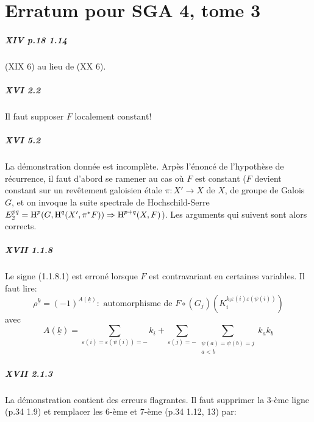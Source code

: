 
\appendix
\chapter{Erratum pour SGA 4, tome 3}

\paragraph{XIV p.18 1.14}
(XIX 6) au lieu de (XX 6). 

\paragraph{XVI 2.2}
Il faut supposer $F$ localement constant!

\paragraph{XVI 5.2}
La démonstration donnée est incomplète. Arpès l'énoncé de 
l'hypothèse de récurrence, il faut d'abord se ramener au cas o\`u $F$ est 
constant ($F$ devient constant sur un rev\^etement galoisien étale 
$\pi:X'\to X$ de $X$, de groupe de Galois $G$, et on invoque la suite spectrale 
de Hochschild-Serre $E_2^{p q}=\operatorname{H}^p(G,\operatorname{H}^q(X',\pi^\ast F))\Rightarrow \operatorname{H}^{p+q}(X,F)$). 
Les arguments qui suivent sont alors corrects. 

\paragraph{XVII 1.1.8}
Le signe (1.1.8.1) est erroné lorsque $F$ est contravariant en certaines 
variables. Il faut lire: 
\begin{equation*}\tag{1.1.8.1}
  \rho^{\underline k} = (-1)^{A(\underline k)}: \text{ automorphisme de }
F\circ (G_j)\left(K_i^{k_i\varepsilon(i)\varepsilon(\psi(i))}\right) 
\end{equation*}
avec 
\[
  A(\underline k) = \sum_{\varepsilon(i) = \varepsilon(\psi(i))=-} k_i + \sum_{\varepsilon(j)=-} \sum_{\substack{\psi(a)=\psi(b)=j \\ a<b}} k_a k_b 
\]

\paragraph{XVII 2.1.3}
La démonstration contient des erreurs flagrantes. Il faut supprimer la 
3-ème ligne (p.34 1.9) et remplacer les 6-ème et 7-ème (p.34 1.12, 13) 
par: 

